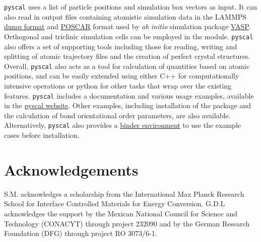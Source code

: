 \documentclass[]{article}
\begin{document}
\texttt{pyscal} uses a list of particle positions and simulation box
vectors as input. It can also read in output files containing atomistic
simulation data in the LAMMPS \citep{Plimpton:1995}
\href{https://lammps.sandia.gov/doc/dump.html}{dump format} and
\href{https://cms.mpi.univie.ac.at/vasp/vasp/POSCAR_file.html}{POSCAR}
format used by \emph{ab initio} simulation package
\href{https://www.vasp.at/}{VASP}. Orthogonal and triclinic simulation
cells can be employed in the module. \texttt{pyscal} also offers a set of
supporting tools including those for reading, writing and splitting of
atomic trajectory files and the creation of perfect crystal structures.
Overall, \texttt{pyscal} also acts as a tool for calculation of
quantities based on atomic positions, and can be easily extended using
either C++ for computationally intensive operations or python for other
tasks that wrap over the existing features. \texttt{pyscal} includes a
documentation and various usage examples, available in the
\href{https://pyscal.readthedocs.io/en/latest/}{pyscal website}. Other
examples, including installation of the package and the calculation of
bond orientational order parameters, are also available. Alternatively,
\texttt{pyscal} also provides a
\href{https://mybinder.org/v2/gh/srmnitc/pyscal/master?filepath=examples\%2F}{binder
environment} to use the example cases before installation.

\section{Acknowledgements}\label{acknowledgements}

S.M. acknowledges a scholarship from the International Max Planck
Research School for Interface Controlled Materials for Energy
Conversion. G.D.L acknowledges the support by the Mexican National
Council for Science and Technology (CONACYT) through project 232090 and
by the German Research Foundation (DFG) through project RO 3073/6-1.

\renewcommand\refname{References}

\end{document}
